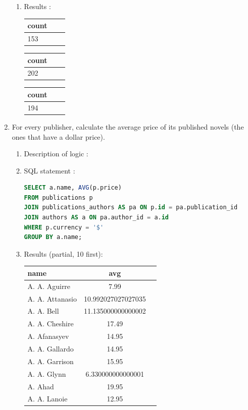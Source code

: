 \documentclass[doubleside, titlepage]{article}
\begin{document}
\begin{enumerate}
\begin{enumerate}
	\item Results :\\
	
	\begin{tabular}{|l|c|r|}
	  \hline
		count \\
	  \hline	
		153\\
	  \hline
	\end{tabular}
	
	\begin{tabular}{|l|c|r|}
	  \hline
		count \\
	  \hline	
		202\\
	  \hline
	\end{tabular}
	
	\begin{tabular}{|l|c|r|}
	  \hline
		count \\
	  \hline	
		194\\
	  \hline
	\end{tabular}

\end{enumerate}
	
\item For every publisher, calculate the average price of its published novels (the ones that have a dollar price).
	
	\begin{enumerate}
	\item Description of logic :\\
	\item SQL statement :
		\begin{lstlisting}[language=SQL,showspaces=false,basicstyle=\ttfamily,numberstyle=\tiny,commentstyle=\color{gray}]
SELECT a.name, AVG(p.price)
FROM publications p
JOIN publications_authors AS pa ON p.id = pa.publication_id
JOIN authors AS a ON pa.author_id = a.id
WHERE p.currency = '$'
GROUP BY a.name;
		\end{lstlisting}

	\item Results (partial, 10 first):\\
	
	\begin{tabular}{|l|c|r|}
	  \hline
		  name & avg \\
	  \hline	
			A. A. Aguirre & 7.99\\
			A. A. Attanasio	& 10.992027027027035\\
			A. A. Bell	& 11.135000000000002\\
			A. A. Cheshire	& 17.49\\
			A. Afanasyev	& 14.95\\
			A. A. Gallardo	& 14.95\\
			A. A. Garrison	& 15.95\\
			A. A. Glynn	& 6.330000000000001\\
			A. Ahad	& 19.95\\
			A. A. Lanoie	& 12.95\\
	  \hline
\end{tabular}
	

\end{enumerate}
\end{enumerate}
\end{document}
